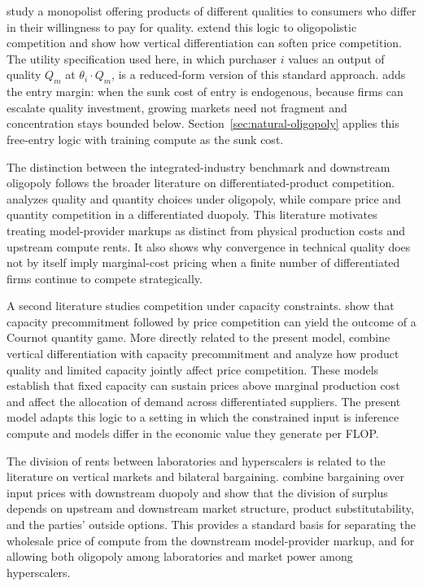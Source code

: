 \documentclass[11pt]{article}
\begin{document}
\citet{mussaRosen1978} study a monopolist offering products of different qualities to consumers who differ in their willingness to pay for quality. \citet{shakedSutton1982} extend this logic to oligopolistic competition and show how vertical differentiation can soften price competition. The utility specification used here, in which purchaser $i$ values an output of quality $Q_m$ at $\theta_i \cdot Q_m$, is a reduced-form version of this standard approach. \citet{sutton1991} adds the entry margin: when the sunk cost of entry is endogenous, because firms can escalate quality investment, growing markets need not fragment and concentration stays bounded below. Section~\ref{sec:natural-oligopoly} applies this free-entry logic with training compute as the sunk cost.

The distinction between the integrated-industry benchmark and downstream oligopoly follows the broader literature on differentiated-product competition. \citet{dixit1979quality} analyzes quality and quantity choices under oligopoly, while \citet{singhVives1984} compare price and quantity competition in a differentiated duopoly. This literature motivates treating model-provider markups as distinct from physical production costs and upstream compute rents. It also shows why convergence in technical quality does not by itself imply marginal-cost pricing when a finite number of differentiated firms continue to compete strategically.

A second literature studies competition under capacity constraints. \citet{krepsScheinkman1983} show that capacity precommitment followed by price competition can yield the outcome of a Cournot quantity game. More directly related to the present model, \citet{boccardWauthy2010} combine vertical differentiation with capacity precommitment and analyze how product quality and limited capacity jointly affect price competition. These models establish that fixed capacity can sustain prices above marginal production cost and affect the allocation of demand across differentiated suppliers. The present model adapts this logic to a setting in which the constrained input is inference compute and models differ in the economic value they generate per FLOP.

The division of rents between laboratories and hyperscalers is related to the literature on vertical markets and bilateral bargaining. \citet{hornWolinsky1988} combine bargaining over input prices with downstream duopoly and show that the division of surplus depends on upstream and downstream market structure, product substitutability, and the parties' outside options. This provides a standard basis for separating the wholesale price of compute from the downstream model-provider markup, and for allowing both oligopoly among laboratories and market power among hyperscalers.
\end{document}
